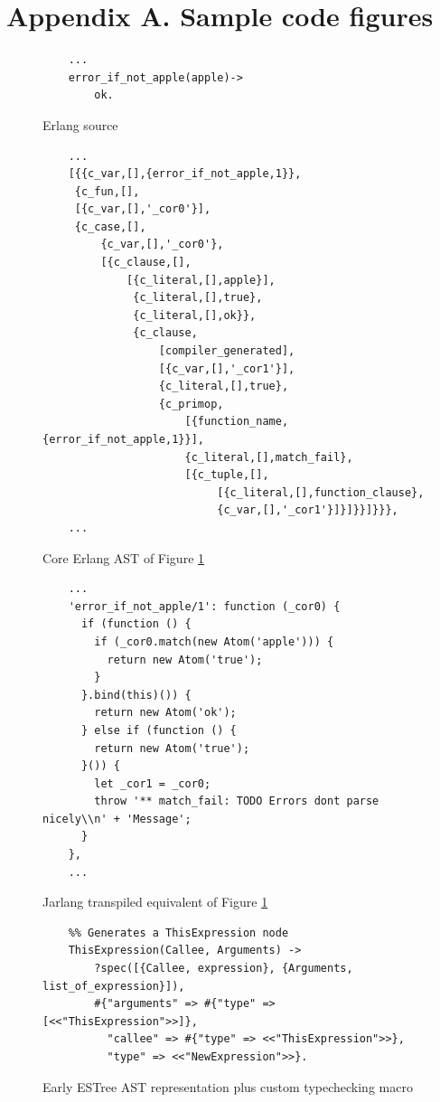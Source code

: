 \documentclass[twoside,12pt,titlepage,a4paper]{article}
\begin{document}
\section*{Appendix A. Sample code figures}
\begin{figure}[th]
	\centering
	\begin{verbatim}
	...
	error_if_not_apple(apple)->
		ok.
	\end{verbatim}
	\caption{Erlang source}
	\label{fig:code_comparison:erl}
\end{figure}
\begin{figure}[th]
	\centering
	\begin{verbatim}
	...
	[{{c_var,[],{error_if_not_apple,1}},
	 {c_fun,[],
	 [{c_var,[],'_cor0'}],
	 {c_case,[],
	     {c_var,[],'_cor0'},
	     [{c_clause,[],
	         [{c_literal,[],apple}],
	          {c_literal,[],true},
	          {c_literal,[],ok}},
	          {c_clause,
	              [compiler_generated],
	              [{c_var,[],'_cor1'}],
	              {c_literal,[],true},
	              {c_primop,
	                  [{function_name,{error_if_not_apple,1}}],
	                  {c_literal,[],match_fail},
	                  [{c_tuple,[],
	                       [{c_literal,[],function_clause},
	                       {c_var,[],'_cor1'}]}]}}]}}},
	...
	\end{verbatim}
	\caption{Core Erlang AST of Figure \ref{fig:code_comparison:erl}}
	\label{fig:code_comparison:erl_ast}
\end{figure}
\begin{figure}[th]
	\centering
	\begin{verbatim}
	...
	'error_if_not_apple/1': function (_cor0) {
	  if (function () {
	    if (_cor0.match(new Atom('apple'))) {
	      return new Atom('true');
	    }
	  }.bind(this)()) {
	    return new Atom('ok');
	  } else if (function () {
	    return new Atom('true');
	  }()) {
	    let _cor1 = _cor0;
	    throw '** match_fail: TODO Errors dont parse nicely\\n' + 'Message';
	  }
	},
	...
	\end{verbatim}
	\caption{Jarlang transpiled equivalent of Figure \ref{fig:code_comparison:erl}}
	\label{fig:code_comparison:js}
\end{figure}
\begin{figure}[th]
	\centering
	\begin{verbatim}
	%% Generates a ThisExpression node
	ThisExpression(Callee, Arguments) ->
	    ?spec([{Callee, expression}, {Arguments, list_of_expression}]),
	    #{"arguments" => #{"type" => [<<"ThisExpression">>]},
	      "callee" => #{"type" => <<"ThisExpression">>},
	      "type" => <<"NewExpression">>}.
	\end{verbatim}
	\caption{Early ESTree AST representation plus custom typechecking macro}
	\label{fig:estree_old:erl}
\end{figure}
\end{document}
